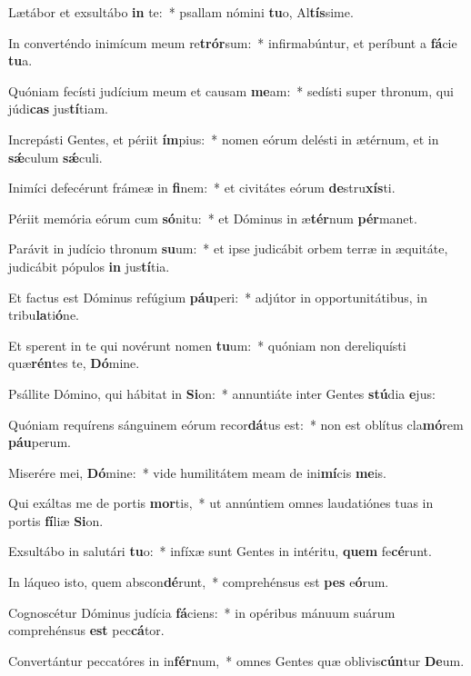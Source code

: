 \item Lætábor et exsultábo \textbf{in} te:~* psallam nómini \textbf{tu}o, Al\textbf{tís}sime.
\item In converténdo inimícum meum re\textbf{trór}sum:~* infirmabúntur, et períbunt a \textbf{fá}cie \textbf{tu}a.
\item Quóniam fecísti judícium meum et causam \textbf{me}am:~* sedísti super thronum, qui júdi\textbf{cas} jus\textbf{tí}tiam.
\item Increpásti Gentes, et périit \textbf{ím}pius:~* nomen eórum delésti in ætérnum, et in \textbf{sǽ}culum \textbf{sǽ}culi.
\item Inimíci defecérunt frámeæ in \textbf{fi}nem:~* et civitátes eórum \textbf{de}stru\textbf{xís}ti.
\item Périit memória eórum cum \textbf{só}nitu:~* et Dóminus in æ\textbf{tér}num \textbf{pér}manet.
\item Parávit in judício thronum \textbf{su}um:~* et ipse judicábit orbem terræ in æquitáte, judicábit pópulos \textbf{in} jus\textbf{tí}tia.
\item Et factus est Dóminus refúgium \textbf{páu}peri:~* adjútor in opportunitátibus, in tribu\textbf{la}ti\textbf{ó}ne.
\item Et sperent in te qui novérunt nomen \textbf{tu}um:~* quóniam non dereliquísti quæ\textbf{rén}tes te, \textbf{Dó}mine.
\item Psállite Dómino, qui hábitat in \textbf{Si}on:~* annuntiáte inter Gentes \textbf{stú}dia \textbf{e}jus:
\item Quóniam requírens sánguinem eórum recor\textbf{dá}tus est:~* non est oblítus cla\textbf{mó}rem \textbf{páu}perum.
\item Miserére mei, \textbf{Dó}mine:~* vide humilitátem meam de ini\textbf{mí}cis \textbf{me}is.
\item Qui exáltas me de portis \textbf{mor}tis,~* ut annúntiem omnes laudatiónes tuas in portis \textbf{fí}liæ \textbf{Si}on.
\item Exsultábo in salutári \textbf{tu}o:~* infíxæ sunt Gentes in intéritu, \textbf{quem} fe\textbf{cé}runt.
\item In láqueo isto, quem abscon\textbf{dé}runt,~* comprehénsus est \textbf{pes} e\textbf{ó}rum.
\item Cognoscétur Dóminus judícia \textbf{fá}ciens:~* in opéribus mánuum suárum comprehénsus \textbf{est} pec\textbf{cá}tor.
\item Convertántur peccatóres in in\textbf{fér}num,~* omnes Gentes quæ oblivis\textbf{cún}tur \textbf{De}um.
